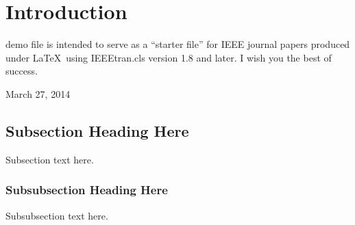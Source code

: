 \section{Introduction}

 demo file is intended to serve as a ``starter file''
for IEEE journal papers produced under \LaTeX\ using
IEEEtran.cls version 1.8 and later. I wish you the best of success.

\hfill March 27, 2014


\subsection{Subsection Heading Here}
Subsection text here.


\subsubsection{Subsubsection Heading Here}
Subsubsection text here.